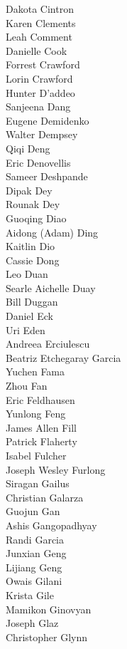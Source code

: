 Dakota Cintron\\
Karen Clements\\
Leah Comment\\
Danielle Cook\\
Forrest Crawford\\
Lorin Crawford\\
Hunter D'addeo\\
Sanjeena Dang\\
Eugene Demidenko\\
Walter Dempsey\\
Qiqi Deng\\
Eric Denovellis\\
Sameer Deshpande\\
Dipak Dey\\
Rounak Dey\\
Guoqing Diao\\
Aidong (Adam) Ding\\
Kaitlin Dio\\
Cassie Dong\\
Leo Duan\\
Searle Aichelle Duay\\
Bill Duggan\\
Daniel Eck\\
Uri Eden\\
Andreea Erciulescu\\
Beatriz Etchegaray Garcia\\
Yuchen Fama\\
Zhou Fan\\
Eric Feldhausen\\
Yunlong Feng\\
James Allen Fill\\
Patrick Flaherty\\
Isabel Fulcher\\
Joseph Wesley Furlong\\
Siragan Gailus\\
Christian Galarza\\
Guojun Gan\\
Ashis Gangopadhyay\\
Randi Garcia\\
Junxian Geng\\
Lijiang Geng\\
Owais Gilani\\
Krista Gile\\
Mamikon Ginovyan\\
Joseph Glaz\\
Christopher Glynn\\
